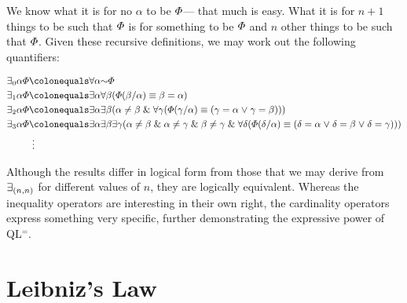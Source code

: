 We know what it is for no $\alpha$ to be $\varPhi$--- that much is easy.
What it is for $n+1$ things to be such that $\varPhi$ is for something to be $\varPhi$ and $n$ other things to be such that $\varPhi$. 
Given these recursive definitions, we may work out the following quantifiers:

\vspace{-.2in}
\begin{align*}
  \qt{\exists_0}{\alpha}\metaA &\colonequals \qt{\forall}{\alpha}\enot\metaA\\
  \qt{\exists_1}{\alpha}\metaA &\colonequals \qt{\exists}{\alpha}\qt{\forall}{\beta}(\metaA(\beta/\alpha) \eiff \beta = \alpha)\\ 
  \qt{\exists_2}{\alpha}\metaA &\colonequals \qt{\exists}{\alpha}\qt{\exists}{\beta}(\alpha\neq\beta \eand \qt{\forall}{\gamma}(\metaA(\gamma/\alpha) \eiff (\gamma = \alpha \eor \gamma = \beta)))\\
  \qt{\exists_3}{\alpha}\metaA &\colonequals \qt{\exists}{\alpha}
      \qt{\exists}{\beta}
        \qt{\exists}{\gamma}(
          \alpha\neq\beta \eand \alpha\neq\gamma \eand \beta\neq\gamma \eand \qt{\forall}{\delta}(
            \metaA(\delta/\alpha) \eiff (
              \delta = \alpha \eor \delta = \beta \eor \delta = \gamma
            )
          )
        )\\
  & ~\vdots
\end{align*}

Although the results differ in logical form from those that we may derive from $\qt{\exists_{(n,n)}}$ for different values of $n$, they are logically equivalent.
Whereas the inequality operators are interesting in their own right, the cardinality operators express something very specific, further demonstrating the expressive power of QL$^=$.




\section{Leibniz's Law}

